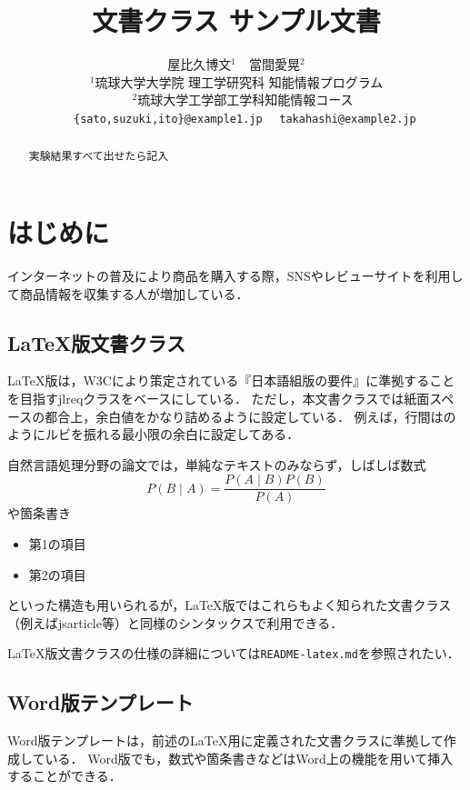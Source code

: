 \documentclass[
  platex, dvipdfmx,  %
]{nlp2024}
\title{\pkg{NLP2024}文書クラス サンプル文書}
\author{%
  屋比久博文${}^{1}$　當間愛晃${}^{2}$　\\
${}^{1}$琉球大学大学院 理工学研究科 知能情報プログラム\\
　${}^{2}$琉球大学工学部工学科知能情報コース\\
　 \texttt{\{sato,suzuki,ito\}@example1.jp}
　\texttt{takahashi@example2.jp}\\}
\newcommand{\pkg}[1]{\textsf{#1}}
\newcommand{\code}[1]{\texttt{#1}}
\begin{document}
\maketitle
\begin{abstract}
実験結果すべて出せたら記入
\end{abstract}

\section{はじめに}
インターネットの普及により商品を購入する際，SNSやレビューサイトを利用して商品情報を収集する人が増加している\cite{consume_doc}．

\subsection{LaTeX版文書クラス}
LaTeX版は，W3Cにより策定されている『日本語組版の要件』\cite{JLREQ}に準拠することを目指す\pkg{jlreq}クラスをベースにしている．
ただし，本文書クラスでは紙面スペースの都合上，余白値をかなり詰めるように設定している．
例えば，行間はのようにルビを振れる最小限の余白に設定してある．

自然言語処理分野の論文では，単純なテキストのみならず，しばしば数式
%
\begin{equation}
P(B\mid A) = \frac{P(A\mid B)P(B)}{P(A)}
\end{equation}
%
や箇条書き
%
\begin{itemize}
\item 第1の項目
\item 第2の項目
\end{itemize}
%
といった構造も用いられるが，LaTeX版ではこれらもよく知られた文書クラス（例えば\pkg{jsarticle}等）と同様のシンタックスで利用できる．

LaTeX版文書クラスの仕様の詳細については\code{README-latex.md}を参照されたい．


\subsection{Word版テンプレート}
Word版テンプレートは，前述のLaTeX用に定義された文書クラスに準拠して作成している．
Word版でも，数式や箇条書きなどはWord上の機能を用いて挿入することができる．
\end{document}
